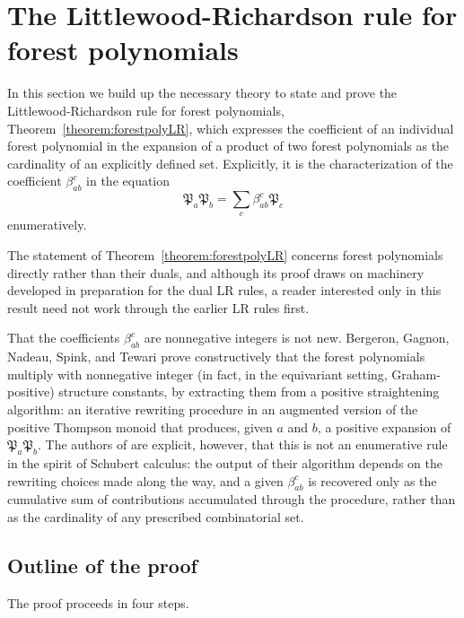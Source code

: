 \documentclass[a4paper,fleqn]{cas-sc}
\theoremstyle{definition}
\theoremstyle{remark}
\numberwithin{equation}{subsection}
\newcommand{\forest}{\mathfrak{P}}
\begin{document}
\section{The Littlewood-Richardson rule for forest polynomials}\label{section:forestrule}

In this section we build up the necessary theory to state and prove the Littlewood-Richardson rule for forest polynomials, Theorem~\ref{theorem:forestpolyLR}, which expresses the coefficient of an individual forest polynomial in the expansion of a product of two forest polynomials as the cardinality of an explicitly defined set. Explicitly, it is the characterization of the coefficient $\beta_{ab}^c$ in the equation
$$\forest_a\forest_b = \sum_{c}\beta_{ab}^c\forest_c$$
enumeratively.

The statement of Theorem~\ref{theorem:forestpolyLR} concerns forest polynomials directly rather than their duals, and although its proof draws on machinery developed in preparation for the dual LR rules, a reader interested only in this result need not work through the earlier LR rules first.

That the coefficients $\beta_{ab}^c$ are nonnegative integers is not new. Bergeron, Gagnon, Nadeau, Spink, and Tewari \cite{bergeron2025equivariant} prove constructively that the forest polynomials multiply with nonnegative integer (in fact, in the equivariant setting, Graham-positive) structure constants, by extracting them from a positive straightening algorithm: an iterative rewriting procedure in an augmented version of the positive Thompson monoid that produces, given $a$ and $b$, a positive expansion of $\forest_a \forest_b$. The authors of \cite{bergeron2025equivariant} are explicit, however, that this is not an enumerative rule in the spirit of Schubert calculus: the output of their algorithm depends on the rewriting choices made along the way, and a given $\beta_{ab}^c$ is recovered only as the cumulative sum of contributions accumulated through the procedure, rather than as the cardinality of any prescribed combinatorial set.


\subsection*{Outline of the proof}

The proof proceeds in four steps.
\end{document}
